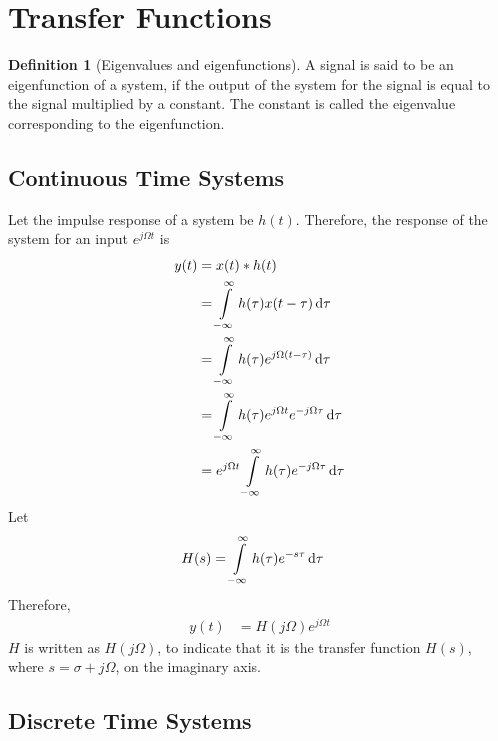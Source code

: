 \documentclass[titlepage, fleqn, a4paper, 12pt, twoside]{article}
\theoremstyle{definition}
\newtheorem{definition}{Definition}
\theoremstyle{theorem}
\begin{document}
\section{Transfer Functions}

\begin{definition}[Eigenvalues and eigenfunctions]
	A signal is said to be an eigenfunction of a system, if the output of the system for the signal is equal to the signal multiplied by a constant.
	The constant is called the eigenvalue corresponding to the eigenfunction.
\end{definition}

\subsection{Continuous Time Systems}

Let the impulse response of a system be $h(t)$.
Therefore, the response of the system for an input $e^{j \Omega t}$ is
\begin{align*}
	y(t) &= x(t) \ast h(t)\\
	&= \int\limits_{-\infty}^{\infty} h(\tau) x(t - \tau) \dif \tau\\
	&= \int\limits_{-\infty}^{\infty} h(\tau) e^{j \Omega (t - \tau)} \dif \tau\\
	&= \int\limits_{-\infty}^{\infty} h(\tau) e^{j \Omega t} e^{-j \Omega \tau} \dif \tau\\
	&= e^{j \Omega t} \int\limits_{-\infty}^{\infty} h(\tau) e^{-j \Omega \tau} \dif \tau
\end{align*}
Let
\begin{align*}
	H(s) &= \int\limits_{-\infty}^{\infty} h(\tau) e^{-s \tau} \dif \tau
\end{align*}
Therefore,
\begin{align*}
	y(t) &= H(j \Omega) e^{j \Omega t}
\end{align*}
$H$ is written as $H(j \Omega)$, to indicate that it is the transfer function $H(s)$, where $s = \sigma + j \Omega$, on the imaginary axis.

\subsection{Discrete Time Systems}
\end{document}
